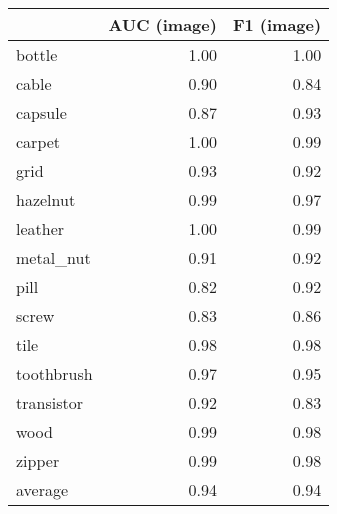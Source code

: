 \begin{tabular}{lrr}
\toprule
{} &  AUC (image) &  F1 (image) \\
\midrule
bottle     &         1.00 &        1.00 \\
cable      &         0.90 &        0.84 \\
capsule    &         0.87 &        0.93 \\
carpet     &         1.00 &        0.99 \\
grid       &         0.93 &        0.92 \\
hazelnut   &         0.99 &        0.97 \\
leather    &         1.00 &        0.99 \\
metal\_nut  &         0.91 &        0.92 \\
pill       &         0.82 &        0.92 \\
screw      &         0.83 &        0.86 \\
tile       &         0.98 &        0.98 \\
toothbrush &         0.97 &        0.95 \\
transistor &         0.92 &        0.83 \\
wood       &         0.99 &        0.98 \\
zipper     &         0.99 &        0.98 \\
average    &         0.94 &        0.94 \\
\bottomrule
\end{tabular}
